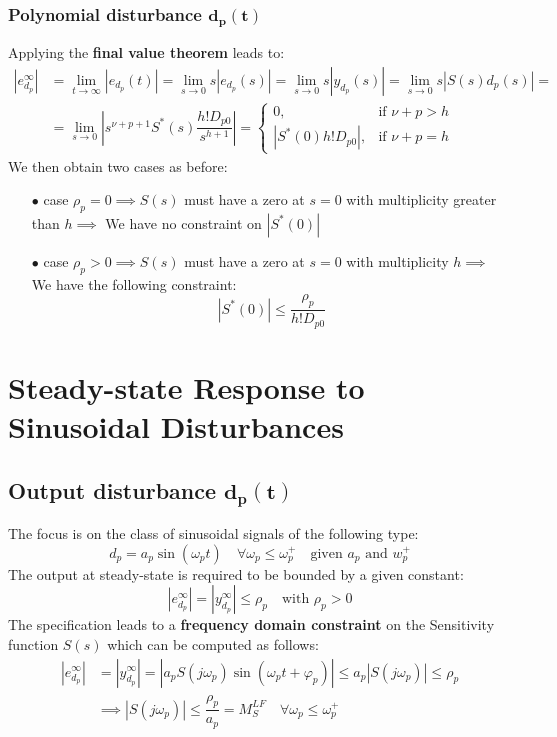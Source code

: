 \documentclass[a4paper,10pt,titlepage]{article}
\numberwithin{equation}{subsection}
\begin{document}
	\subsubsection{Polynomial disturbance $\bm{d_p(t)}$}
	Applying the \textbf{final value theorem} leads to:
	\begin{align}
		\left| e_{d_p}^\infty \right| &= \displaystyle\lim_{t\to\infty} 	\left|e_{d_p}(t)\right| = \displaystyle\lim_{s\to0}s \left|e_{d_p}(s)\right| = \displaystyle\lim_{s\to0}s \left|y_{d_p}(s)\right| = \displaystyle\lim_{s\to0}s \left| S(s)d_p(s) \right| = \nonumber \\
		&= \displaystyle\lim_{s\to0}	\left|s^{\nu+p+1}S^*(s)\dfrac{h!D_{p0}}{s^{h+1}}\right| =
		\begin{cases}
			0, & \text{if } \nu+p>h \\
			\left|S^*(0)h!D_{p0}\right|, & \text{if } \nu+p = h
		\end{cases}
	\end{align}
	We then obtain two cases as before:
	\begin{enumerate}
		\item[$\bullet$] case $\rho_p=0 \implies S(s)$ must have a zero at $s=0$ with multiplicity greater than $h \implies$ We have no constraint on $\left|S^*(0)\right| $ 
		\item[$\bullet$] case $\rho_p>0 \implies S(s)$ must have a zero at $s=0$ with multiplicity $h \implies$ We have the following constraint:
		\begin{equation}
			\left|S^*(0)\right| \leq \dfrac{\rho_p}{h!D_{p0}}	
		\end{equation}
	\end{enumerate}
	
	\section{Steady-state Response to Sinusoidal Disturbances}
	\subsection{Output disturbance $\bm{d_p(t)}$}
	The focus is on the class of sinusoidal signals of the following type:
	\begin{equation}
		d_p = a_p\sin(\omega_pt) \quad \forall\omega_p\leq\omega_p^+ \quad \text{given } a_p \text{ and } w_p^+
	\end{equation}
	The output at steady-state is required to be bounded by a given constant:
	\begin{equation}
		\left| e_{d_p}^\infty \right| = \left| y_{d_p}^\infty \right| \leq \rho_p \quad \text{with } \rho_p>0
	\end{equation}
	The specification leads to a \textbf{frequency domain constraint} on the Sensitivity function $S(s)$ which can be computed as follows:
	\begin{align}
		\left| e_{d_p}^\infty \right| &= \left| y_{d_p}^\infty \right| = \left| a_pS(j\omega_p)\sin(\omega_pt+\varphi_p) \right| \leq a_p\left|S(j\omega_p)\right| \leq \rho_p \nonumber \\
		&\implies \left|S(j\omega_p)\right| \leq \dfrac{\rho_p}{a_p} = M_S^{LF} \quad \forall\omega_p \leq \omega_p^+
	\end{align}
	
\end{document}
